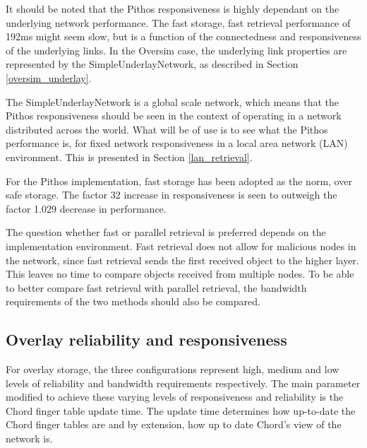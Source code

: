 It should be noted that the Pithos responsiveness is highly dependant on the underlying network performance. The fast storage, fast retrieval performance of 192ms might seem slow, but is a function of the connectedness and responsiveness of the underlying links. In the Oversim case, the underlying link properties are represented by the SimpleUnderlayNetwork, as described in Section \ref{oversim_underlay}.

The SimpleUnderlayNetwork is a global scale network, which means that the Pithos responsiveness should be seen in the context of operating in a network distributed across the world. What will be of use is to see what the Pithos performance is, for fixed network responsiveness in a local area network (LAN) environment. This is presented in Section \ref{lan_retrieval}.

For the Pithos implementation, fast storage has been adopted as the norm, over safe storage. The factor 32 increase in responsiveness is seen to outweigh the factor 1.029 decrease in performance.

The question whether fast or parallel retrieval is preferred depends on the implementation environment. Fast retrieval does not allow for malicious nodes in the network, since fast retrieval sends the first received object to the higher layer. This leaves no time to compare objects received from multiple nodes. To be able to better compare fast retrieval with parallel retrieval, the bandwidth requirements of the two methods should also be compared.

\subsection{Overlay reliability and responsiveness}
\label{overlay_resp_rel_results}

For overlay storage, the three configurations represent high, medium and low levels of reliability and bandwidth requirements respectively. The main parameter modified to achieve these varying levels of responsiveness and reliability is the Chord finger table update time. The update time determines how up-to-date the Chord finger tables are and by extension, how up to date Chord's view of the network is.

